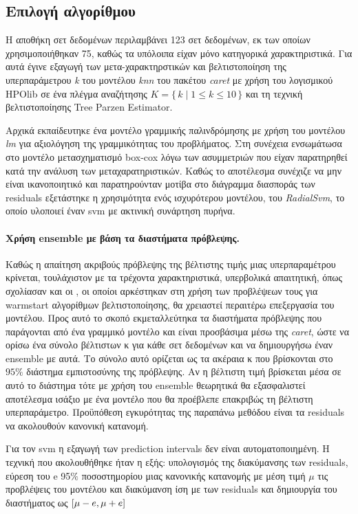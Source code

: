 \documentclass[]{article}
\numberwithin{equation}{section}		%
\numberwithin{figure}{section}			%
\numberwithin{table}{section}				%
\begin{document}
    \subsection{Επιλογή αλγορίθμου}
    Η αποθήκη σετ δεδομένων περιλαμβάνει 123 σετ δεδομένων, εκ των οποίων χρησιμοποιήθηκαν 75, καθώς τα υπόλοιπα είχαν μόνο κατηγορικά χαρακτηριστικά. Για αυτά έγινε εξαγωγή των μετα-χαρακτηρστικών και βελτιστοποίηση της υπερπαράμετρου \textit{k} του μοντέλου \textit{knn} του πακέτου \textit{caret} με χρήση του λογισμικού HPOlib \citep{hpolib} σε ένα πλέγμα αναζήτησης $K = \{\, k \mid 1 \le k \le 10 \,\}$ και τη τεχνική βελτιστοποίησης Tree Parzen   Estimator. 
    
    Αρχικά εκπαίδευτηκε ένα μοντέλο γραμμικής παλινδρόμησης με χρήση του μοντέλου \textit{lm} για αξιολόγηση της γραμμικότητας του προβλήματος. Στη συνέχεια ενσωμάτωσα στο μοντέλο μετασχηματισμό box-cox λόγω των ασυμμετριών που είχαν παρατηρηθεί κατά την ανάλυση των μεταχαρατηριστικών. Καθώς το αποτέλεσμα συνέχιζε να μην είναι ικανοποιητικό και παρατηρούνταν μοτίβα στο διάγραμμα διασποράς των residuals εξετάστηκε η χρησιμότητα ενός ισχυρότερου μοντέλου, του \textit{RadialSvm}, το οποίο υλοποιεί έναν svm με ακτινική συνάρτηση πυρήνα. 
   
   \paragraph{Χρήση ensemble με βάση τα διαστήματα πρόβλεψης.} Καθώς η απαίτηση ακριβούς πρόβλεψης της βέλτιστης τιμής μιας υπερπαραμέτρου κρίνεται, τουλάχιστον με τα τρέχοντα χαρακτηριστικά, υπερβολικά απαιτητική, όπως σχολίασαν και οι \citet{Feurer:2014:UMI:3015544.3015549}, οι οποίοι αρκέστηκαν στη χρήση των προβλέψεων τους για warmstart αλγορίθμων βελτιστοποίησης, θα χρειαστεί περαιτέρω επεξεργασία του μοντέλου. Προς αυτό το σκοπό εκμεταλλεύτηκα τα διαστήματα πρόβλεψης που παράγονται από ένα γραμμικό μοντέλο και είναι προσβάσιμα μέσω της \textit{caret}, ώστε να ορίσω ένα σύνολο βέλτιστων κ για κάθε σετ δεδομένων και να δημιουργήσω έναν ensemble με αυτά. Το σύνολο αυτό ορίζεται ως τα ακέραια κ που βρίσκονται στο $95\%$ διάστημα εμπιστοσύνης της πρόβλεψης. Αν η βέλτιστη τιμή βρίσκεται μέσα σε αυτό το διάστημα τότε με χρήση του ensemble θεωρητικά θα εξασφαλιστεί αποτέλεσμα ισάξιο με ένα μοντέλο που θα προέβλεπε επακριβώς τη βέλτιστη υπερπαράμετρο. Προϋπόθεση εγκυρότητας της παραπάνω μεθόδου είναι τα residuals να ακολουθούν κανονική κατανομή.
   
   Για τον svm η εξαγωγή των prediction intervals δεν είναι αυτοματοποιημένη. Η τεχνική που ακολουθήθηκε ήταν η εξής: υπολογισμός της διακύμανσης των residuals, εύρεση του e 95$\%$ ποσοστημορίου μιας κανονικής κατανομής με μέση τιμή $\mu$ τις προβλέψεις του μοντέλου και διακύμανση ίση με των residuals και δημιουργία του διαστήματος ως $ \interval{\mu - e}{\mu + e}$
   
\end{document}
